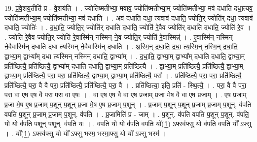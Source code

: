 \documentclass[17pt]{extarticle}
\begin{document}
19. प्र॒वे॒शय॒तीति॑ प्र - वे॒शय॑ति । . ज्योति॑ष्मतीभ्या॒ मवाव॒ ज्योति॑ष्मतीभ्या॒म् ज्योति॑ष्मतीभ्या॒ मव॑ दधाति दधा॒त्यव॒ ज्योति॑ष्मतीभ्या॒म् ज्योति॑ष्मतीभ्या॒ मव॑ दधाति । . अव॑ दधाति दधा॒ त्यवाव॑ दधाति॒ ज्योति॒र् ज्योति॑र् दधा॒ त्यवाव॑ दधाति॒ ज्योतिः॑ । . द॒धा॒ति॒ ज्योति॒र् ज्योति॑र् दधाति दधाति॒ ज्योति॑ रे॒वैव ज्योति॑र् दधाति दधाति॒ ज्योति॑ रे॒व । . ज्योति॑ रे॒वैव ज्योति॒र् ज्योति॑ रे॒वास्मि॑न् नस्मिन् ने॒व ज्योति॒र् ज्योति॑ रे॒वास्मिन्न्॑ । . ए॒वास्मि॑न् नस्मिन् ने॒वैवास्मि॑न् दधाति दधा त्यस्मिन् ने॒वैवास्मि॑न् दधाति । . अ॒स्मि॒न् द॒धा॒ति॒ द॒धा॒ त्य॒स्मि॒न् न॒स्मि॒न् द॒धा॒ति॒ द्वाभ्या॒म् द्वाभ्या᳚म् दधा त्यस्मिन् नस्मिन् दधाति॒ द्वाभ्या᳚म् । . द॒धा॒ति॒ द्वाभ्या॒म् द्वाभ्या᳚म् दधाति दधाति॒ द्वाभ्या॒म् प्रति॑ष्ठित्यै॒ प्रति॑ष्ठित्यै॒ द्वाभ्या᳚म् दधाति दधाति॒ द्वाभ्या॒म् प्रति॑ष्ठित्यै । . द्वाभ्या॒म् प्रति॑ष्ठित्यै॒ प्रति॑ष्ठित्यै॒ द्वाभ्या॒म् द्वाभ्या॒म् प्रति॑ष्ठित्यै॒ परा॒ परा॒ प्रति॑ष्ठित्यै॒ द्वाभ्या॒म् द्वाभ्या॒म् प्रति॑ष्ठित्यै॒ परा᳚ । . प्रति॑ष्ठित्यै॒ परा॒ परा॒ प्रति॑ष्ठित्यै॒ प्रति॑ष्ठित्यै॒ परा॒ वै वै परा॒ प्रति॑ष्ठित्यै॒ प्रति॑ष्ठित्यै॒ परा॒ वै । . प्रति॑ष्ठित्या॒ इति॒ प्रति॑ - स्थि॒त्यै॒ । . परा॒ वै वै परा॒ परा॒ वा ए॒ष ए॒ष वै परा॒ परा॒ वा ए॒षः । . वा ए॒ष ए॒ष वै वा ए॒ष प्र॒जाम् प्र॒जा मे॒ष वै वा ए॒ष प्र॒जाम् । . ए॒ष प्र॒जाम् प्र॒जा मे॒ष ए॒ष प्र॒जाम् प॒शून् प॒शून् प्र॒जा मे॒ष ए॒ष प्र॒जाम् प॒शून् । . प्र॒जाम् प॒शून् प॒शून् प्र॒जाम् प्र॒जाम् प॒शून्. व॑पति वपति प॒शून् प्र॒जाम् प्र॒जाम् प॒शून्. व॑पति । . प्र॒जामिति॑ प्र - जाम् । . प॒शून्. व॑पति वपति प॒शून् प॒शून्. व॑पति॒ यो यो व॑पति प॒शून् प॒शून्. व॑पति॒ यः । . व॒प॒ति॒ यो यो व॑पति वपति॒ यो᳚(1॒) ऽफ्स्व॑फ्सु यो व॑पति वपति॒ यो᳚ ऽफ्सु । . यो᳚(1॒) ऽफ्स्व॑फ्सु यो यो᳚ ऽफ्सु भस्म॒ भस्मा॒फ्सु यो यो᳚ ऽफ्सु भस्म॑ । \newline
\end{document}
